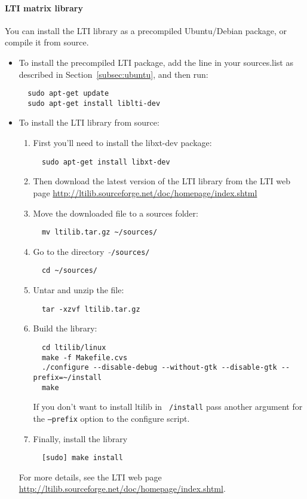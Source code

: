 \documentclass[a4paper,10pt]{article}
\begin{document}
\paragraph{LTI matrix library}
You can install the LTI library as a precompiled Ubuntu/Debian
package, or compile it from source. 
\begin{itemize}
\item To install the precompiled LTI package, add the line in your
  sources.list as described in Section~\ref{subsec:ubuntu}, and then run:
\begin{verbatim}
  sudo apt-get update
  sudo apt-get install liblti-dev
\end{verbatim}
\item To install the LTI library from source:

\begin{enumerate}
\item First you'll need to install the libxt-dev package:
\begin{verbatim}
  sudo apt-get install libxt-dev
\end{verbatim}
\item Then download the latest version of the LTI library from the LTI
  web page
  \url{http://ltilib.sourceforge.net/doc/homepage/index.shtml}
\item Move the downloaded file to a sources folder:
\begin{verbatim}
  mv ltilib.tar.gz ~/sources/
\end{verbatim}
\item Go to the directory \ $\mathtt{\tilde{ }}$\texttt{/sources/}
\begin{verbatim}
  cd ~/sources/
\end{verbatim}
\item Untar and unzip the file:
\begin{verbatim}
  tar -xzvf ltilib.tar.gz
\end{verbatim}
\item Build the library:
\begin{verbatim}
  cd ltilib/linux
  make -f Makefile.cvs
  ./configure --disable-debug --without-gtk --disable-gtk --prefix=~/install
  make
\end{verbatim}
  If you don't want to install ltilib in \texttt{~/install}
   pass another argument for the \texttt{--prefix} option to the configure script.
\item Finally, install the library
\begin{verbatim}
  [sudo] make install
\end{verbatim}
\end{enumerate}
For more details, see the LTI web page
\url{http://ltilib.sourceforge.net/doc/homepage/index.shtml}.
\end{itemize}
\end{document}
